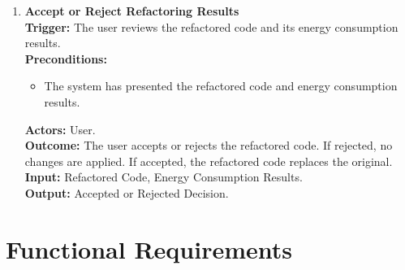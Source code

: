 \documentclass[12pt]{article}
\begin{document}
\begin{enumerate}[label={\bf PUC \arabic*:}, wide=0pt, font=\itshape]
  \item \textbf{Accept or Reject Refactoring Results} \\[2mm]
    \textbf{Trigger:} The user reviews the refactored code and its
    energy consumption results. \\[2mm]
    \textbf{Preconditions:}
    \begin{itemize}
      \item The system has presented the refactored code and energy
        consumption results.
    \end{itemize}
    \textbf{Actors:} User. \\
    \textbf{Outcome:} The user accepts or rejects the refactored
    code. If rejected, no changes are applied. If accepted, the
    refactored code replaces the original. \\
    \textbf{Input:} Refactored Code, Energy Consumption Results. \\
    \textbf{Output:} Accepted or Rejected Decision.

\end{enumerate}

\section{Functional Requirements}
\end{document}

